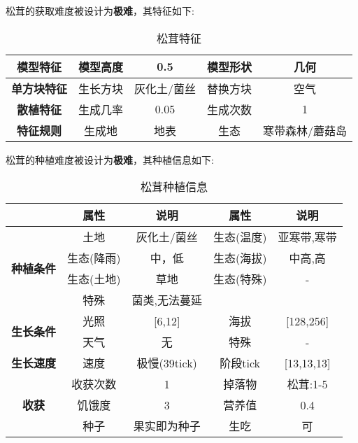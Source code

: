 松茸的获取难度被设计为\textbf{极难}，其特征如下:
\begin{table}[H]
    \centering
    \caption{松茸特征}
    \label{table:松茸特征}
    \setlength{\tabcolsep}{4mm}
    \begin{tabular}{c|cc|cc}
        \toprule
        \textbf{模型特征}   & 模型高度 & 0.5      & 模型形状 & 几何     \\
        \midrule
        \textbf{单方块特征} & 生长方块 & 灰化土/菌丝 & 替换方块 & 空气     \\
        \midrule
        \textbf{散植特征}   & 生成几率 & 0.05   & 生成次数 & 1        \\
        \midrule
        \textbf{特征规则}   & 生成地   & 地表   & 生态     & 寒带森林/蘑菇岛 \\
        \bottomrule
    \end{tabular}
\end{table}


松茸的种植难度被设计为\textbf{极难}，其种植信息如下:

\begin{table}[H]
    \centering
    \caption{松茸种植信息}
    \label{table:松茸种植信息}
    \setlength{\tabcolsep}{4mm}
    \begin{tabular}{c|cc|cc}
        \toprule
                                           & \textbf{属性} & \textbf{说明} & \textbf{属性} & \textbf{说明} \\
        \midrule
        \multirow{4}{*}{\textbf{种植条件}} & 土地          & 灰化土/菌丝    & 生态(温度)    & 亚寒带,寒带    \\
                                           & 生态(降雨)    & 中，低        & 生态(海拔)    & 中高,高            \\
                                           & 生态(土地)    & 草地          & 生态(特殊)    & -             \\
                                           & 特殊          & 菌类,无法蔓延           \\
        \midrule
        \multirow{2}{*}{\textbf{生长条件}} & 光照          & [6,12]        & 海拔          & [128,256]      \\
                                           & 天气          & 无            & 特殊          & -             \\
        \midrule
        \textbf{生长速度}                  & 速度          & 极慢(39tick)     & 阶段tick      & [13,13,13]       \\
        \midrule
        \multirow{3}{*}{\textbf{收获}}     & 收获次数      & 1             & 掉落物        & 松茸:1-5      \\
                                           & 饥饿度        & 3             & 营养值        & 0.4           \\
                                           & 种子          & 果实即为种子  & 生吃          & 可   \\
        \bottomrule
    \end{tabular}
\end{table}

